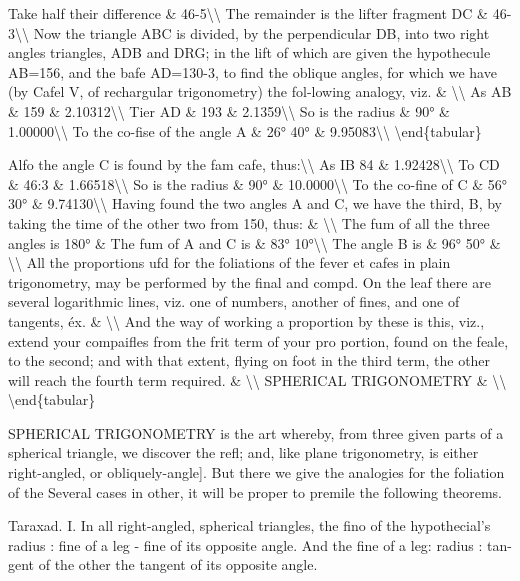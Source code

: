 \documentclass{article}
\begin{document}
Take half their difference \& 46-5\textbackslash{}\textbackslash{}
The remainder is the lifter fragment DC \& 46-3\textbackslash{}\textbackslash{}
Now the triangle ABC is divided, by the perpendicular DB, into two right angles triangles, ADB and DRG; in the lift of which are given the hypothecule AB=156, and the bafe AD=130-3, to find the oblique angles, for which we have (by Cafel V, of rechargular trigonometry) the fol-lowing analogy, viz. \& \textbackslash{}\textbackslash{}
As AB \& 159 \& 2.10312\textbackslash{}\textbackslash{}
Tier AD \& 193 \& 2.1359\textbackslash{}\textbackslash{}
So is the radius \& 90° \& 1.00000\textbackslash{}\textbackslash{}
To the co-fise of the angle A \& 26° 40° \& 9.95083\textbackslash{}\textbackslash{}
\textbackslash{}end\{tabular\}

Alfo the angle C is found by the fam cafe, thus:\textbackslash{}\textbackslash{}
As IB 84 \& 1.92428\textbackslash{}\textbackslash{}
To CD \& 46:3 \& 1.66518\textbackslash{}\textbackslash{}
So is the radius \& 90° \& 10.0000\textbackslash{}\textbackslash{}
To the co-fine of C \& 56° 30° \& 9.74130\textbackslash{}\textbackslash{}
Having found the two angles A and C, we have the third, B, by taking the time of the other two from 150, thus: \& \textbackslash{}\textbackslash{}
The fum of all the three angles is 180° \& The fum of A and C is \& 83° 10°\textbackslash{}\textbackslash{}
The angle B is \& 96° 50° \& \textbackslash{}\textbackslash{}
All the proportions ufd for the foliations of the fever et cafes in plain trigonometry, may be performed by the final and compd. On the leaf there are several logarithmic lines, viz. one of numbers, another of fines, and one of tangents, éx. \& \textbackslash{}\textbackslash{}
And the way of working a proportion by these is this, viz., extend your compaifles from the frit term of your pro portion, found on the feale, to the second; and with that extent, flying on foot in the third term, the other will reach the fourth term required. \& \textbackslash{}\textbackslash{}
SPHERICAL TRIGONOMETRY \& \textbackslash{}\textbackslash{}
\textbackslash{}end\{tabular\}

SPHERICAL TRIGONOMETRY is the art whereby, from three given parts of a spherical triangle, we discover the refl; and, like plane trigonometry, is either right-angled, or obliquely-angle]. But there we give the analogies for the foliation of the Several cases in other, it will be proper to premile the following theorems.

Taraxad. I. In all right-angled, spherical triangles, the fino of the hypothecial’s radius : fine of a leg - fine of its opposite angle. And the fine of a leg: radius : tan- gent of the other the tangent of its opposite angle.
\end{document}
